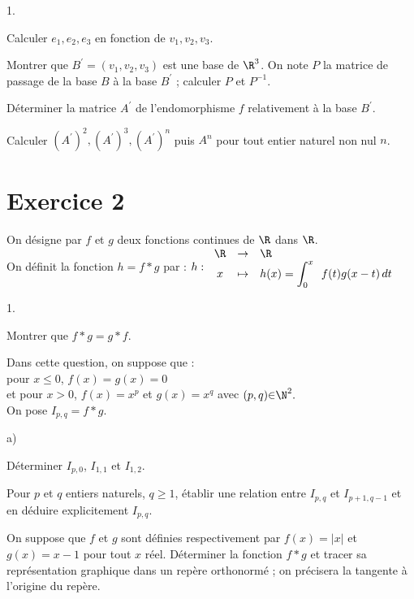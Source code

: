 \documentclass[11pt]{article}%
\begin{document}
\begin{noliste}{1.}
 \setlength{\itemsep}{4mm}
\item Calculer $e_{1},e_{2},e_{3}$ en fonction de $v_{1},v_{2},v_{3}$.

\item Montrer que $B^{\prime } = (v_{1},v_{2},v_{3})$ est une base de
$\R^{3}$. On note $P$ la matrice de passage de la base $B$ à la base
$B^{\prime }$ ; calculer $P$ et $P^{-1}$.

\item Déterminer la matrice $A^{\prime }$ de l'endomorphisme $f$
relativement à la base $B^{\prime }$.

\item Calculer $(A^{\prime })^{2},(A^{\prime })^{3},(A^{\prime })^{n}$
puis $A^{n}$ pour tout entier naturel non nul $n$.
\end{noliste}

\section*{Exercice 2}

On désigne par $f$ et $g$ deux fonctions continues de $\R$ dans $\R$.\\
On définit la fonction $h = f\ast g$ par : $h :\left. 
\begin{array}{ccl}
\R & \rightarrow & \R \\
x & \mapsto & h(x) = \dint{0}{x}\,f(t)g(x-t)\,dt
\end{array}
\right. $

\begin{noliste}{1.}
 \setlength{\itemsep}{4mm}
\item Montrer que $f\ast g = g\ast f$.

\item Dans cette question, on suppose que : \\
pour $x\leq 0$, $f(x) = g(x) = 0$ \\
et pour $x>0$, $f(x) = x^{p}$ et $g(x) = x^{q}$ avec $(p,q){\large \in
}\N^{2}.$\\
On pose $I_{p,q} = f\ast g$.

\begin{noliste}{a)}
 \setlength{\itemsep}{2mm}
\item Déterminer $I_{p,0}$, $I_{1,1}$ et $I_{1,2}$.

\item Pour $p$ et $q$ entiers naturels, $q\geq 1$, établir une relation
entre $I_{p,q}$ et $I_{p + 1,q-1}$ et en déduire explicitement
$I_{p,q}$.
\end{noliste}

\item On suppose que $f$ et $g$ sont définies respectivement par $f(x)
= \left| x\right| $ et $g(x) = x-1$ pour tout $x$ réel. Déterminer
la fonction $f\ast g$ et tracer sa représentation graphique dans un
repère
orthonormé ; on précisera la tangente à l'origine du repère. 
\end{noliste}
\end{document}
